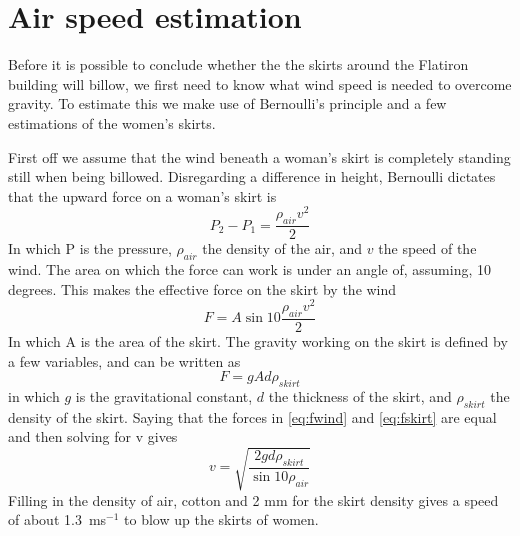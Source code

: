 \clearpage\appendix
\section{Air speed estimation}
\label{airspeedestimation}
Before it is possible to conclude whether the the skirts around the Flatiron building will billow, we first need to know what wind speed is needed to overcome gravity. To estimate this we make use of Bernoulli's principle and a few estimations of the women's skirts.

First off we assume that the wind beneath a woman's skirt is completely standing still when being billowed. Disregarding a difference in height, Bernoulli dictates that the upward force on a woman's skirt is
\begin{equation}
P_2 - P_1 = \frac{\rho_{air}v^2}{2}
\end{equation}
In which P is the pressure, $\rho_{air}$ the density of the air, and $v$ the speed of the wind. The area on which the force can work is under an angle of, assuming, 10 degrees. This makes the effective force on the skirt by the wind
\begin{equation}
F = A \sin{10} \frac{\rho_{air}v^2}{2}
\label{eq:fwind}
\end{equation}
In which A is the area of the skirt. The gravity working on the skirt is defined by a few variables, and can be written as
\begin{equation}
F = g A d \rho_{skirt}
\label{eq:fskirt}
\end{equation}
in which $g$ is the gravitational constant, $d$ the thickness of the skirt, and $\rho_{skirt}$ the density of the skirt. Saying that the forces in \autoref{eq:fwind} and \autoref{eq:fskirt} are equal and then solving for v gives
\begin{equation}
v = \sqrt{\frac{2 g d \rho_{skirt}}{\sin{10} \rho_{air}}}
\end{equation}
Filling in the density of air, cotton and 2 mm for the skirt density gives a speed of about 1.3~ms$^{-1}$ to blow up the skirts of women.

